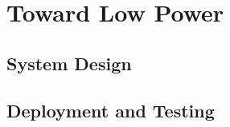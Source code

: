 \chapter{Toward Low Power}
\section{System Design}\label{sysdesign}

\section{Deployment and Testing}
